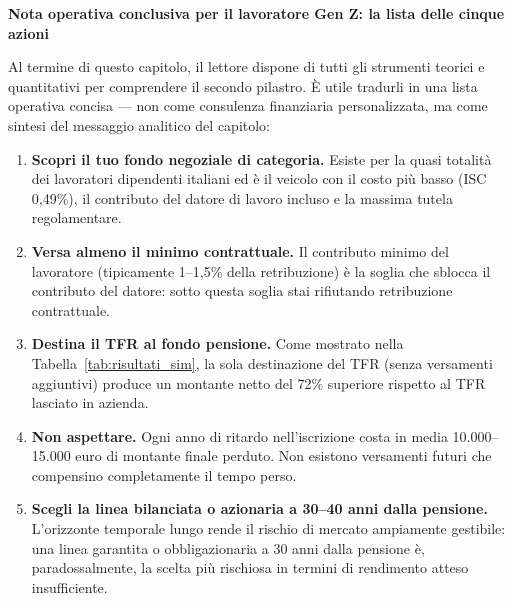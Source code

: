 \medskip
\noindent\textbf{\large Nota operativa conclusiva per il lavoratore Gen Z:
                          la lista delle cinque azioni}

\medskip
\noindent
Al termine di questo capitolo, il lettore dispone di tutti gli strumenti
teorici e quantitativi per comprendere il secondo pilastro.
È utile tradurli in una lista operativa concisa — non come consulenza
finanziaria personalizzata, ma come sintesi del messaggio analitico
del capitolo:

\begin{enumerate}
    \item \textbf{Scopri il tuo fondo negoziale di categoria.}
          Esiste per la quasi totalità dei lavoratori dipendenti
          italiani ed è il veicolo con il costo più basso (ISC 0,49\%),
          il contributo del datore di lavoro incluso e la massima
          tutela regolamentare.
    \item \textbf{Versa almeno il minimo contrattuale.}
          Il contributo minimo del lavoratore (tipicamente 1--1,5\%
          della retribuzione) è la soglia che sblocca il contributo
          del datore: sotto questa soglia stai rifiutando retribuzione
          contrattuale.
    \item \textbf{Destina il TFR al fondo pensione.}
          Come mostrato nella Tabella~\ref{tab:risultati_sim}, la sola
          destinazione del TFR (senza versamenti aggiuntivi) produce un
          montante netto del 72\% superiore rispetto al TFR lasciato
          in azienda.
    \item \textbf{Non aspettare.}
          Ogni anno di ritardo nell'iscrizione costa in media
          10.000--15.000 euro di montante finale perduto.
          Non esistono versamenti futuri che compensino completamente
          il tempo perso.
    \item \textbf{Scegli la linea bilanciata o azionaria a 30--40 anni
          dalla pensione.}
          L'orizzonte temporale lungo rende il rischio di mercato
          ampiamente gestibile: una linea garantita o obbligazionaria
          a 30 anni dalla pensione è, paradossalmente, la scelta
          più rischiosa in termini di rendimento atteso insufficiente.
\end{enumerate}